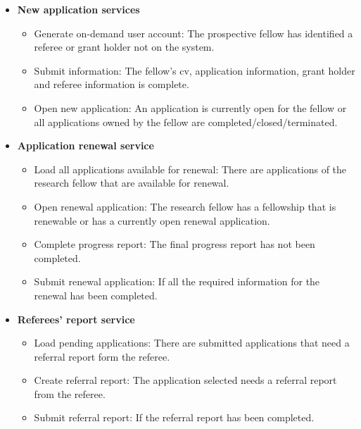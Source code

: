 \documentclass[12pt]{article}
\begin{document}
\begin{itemize}
	\item \textbf{New application services}
		\begin{itemize}
			\item Generate on-demand user account: The prospective fellow has identified a referee or grant holder not on the system.
			\item Submit information: The fellow's cv, application information, grant holder and referee information is complete.
			\item Open new application: An application is currently open for the fellow or all applications owned by the fellow are completed/closed/terminated.			
		\end{itemize}
	
	\item \textbf{Application renewal service}
		\begin{itemize}
			\item Load all applications available for renewal: There are applications of the research fellow that are available for renewal.
			\item Open renewal application: The research fellow has a fellowship that is renewable or has a currently open renewal application.
			\item Complete progress report: The final progress report has not been completed.				
			\item Submit renewal application: If all the required information for the renewal has been completed.									
		\end{itemize}
	
	\item \textbf{Referees' report service}
		\begin{itemize}
			\item Load pending applications: There are submitted applications that need a referral report form the referee.
			\item Create referral report: The application selected needs a referral report from the referee.				
			\item Submit referral report: If the referral report has been completed.									
		\end{itemize}
		

\end{itemize}
\end{document}
